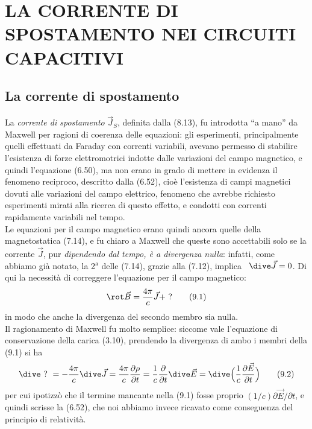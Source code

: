 \section{LA CORRENTE DI SPOSTAMENTO NEI CIRCUITI CAPACITIVI}

\subsection{La corrente di spostamento}

La \textit{corrente di spostamento} $\vec J_S$, definita dalla (8.13), fu
introdotta ``a mano'' da Maxwell per ragioni di coerenza delle equazioni: gli
esperimenti, principalmente quelli effettuati da Faraday con correnti variabili,
avevano permesso di stabilire l'esistenza di forze elettromotrici indotte dalle
variazioni del campo magnetico, e quindi l'equazione (6.50), ma non erano in
grado di mettere in evidenza il fenomeno reciproco, descritto dalla (6.52),
cio\`e l'esistenza di campi magnetici dovuti alle variazioni del campo
elettrico, fenomeno che avrebbe richiesto esperimenti mirati alla ricerca di
questo effetto, e condotti con correnti rapidamente variabili nel tempo.\\
Le equazioni per il campo magnetico erano quindi ancora quelle della
magnetostatica (7.14), e fu chiaro a Maxwell che queste sono accettabili solo se
la corrente $\vec J$, pur \textit{dipendendo dal tempo, \`e a divergenza nulla}:
infatti, come abbiamo gi\`a notato, la 2$^\mathrm{a}$ delle (7.14), grazie alla
(7.12), implica \ $\dive\vec J=0$. Di qui la necessit\`a di correggere
l'equazione per il campo magnetico:
\begin{equation}
  \rot\vec B=\frac{4\pi}{c}\vec J+\ ?
  \tag{9.1}
\end{equation}
in modo che anche la divergenza del secondo membro sia nulla.\\
Il ragionamento di Maxwell fu molto semplice: siccome vale l'equazione di
conservazione della carica (3.10), prendendo la divergenza di ambo i membri
della (9.1) si ha
\begin{equation}
  \dive\ ?\ =-\frac{4\pi}{c}\dive\vec J
  =\frac{4\pi}{c}\frac{\partial\rho}{\partial t}
  =\frac{1}{c}\frac{\partial}{\partial t}\dive\vec E
  =\dive\Big(\frac{1}{c}\frac{\partial\vec E}{\partial t}\Big)
  \tag{9.2}
\end{equation}
per cui ipotizz\`o che il termine mancante nella (9.1) fosse proprio
$(1/c)\partial\vec E/\partial t$, e quindi scrisse la (6.52), che noi abbiamo
invece ricavato come conseguenza del principio di relativit\`a.\\
